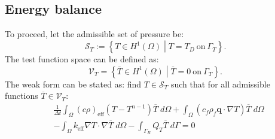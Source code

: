 \subsection{Energy balance}
To proceed, let the admissible set of pressure be:
\begin{equation*}
	\mathscr{S}_T := \left\{T \in H^1 (\Omega) \middle|
	T = T_D~\text{on}~\Gamma_T \right\}.
\end{equation*}
The test function space can be defined as:
\begin{equation*}
\mathscr{V}_{T}= \left \{{\overline{T}}\in H^1(\Omega) \middle | {\overline{T}} =0~\text{on}~\Gamma_T \right \}.
\end{equation*}
The weak form can be stated as: find $T\in\mathscr{S}_T$ such that for all admissible functions $\overline{T}\in\mathscr{V}_T$:
\begin{equation} \label{Eq:waekform_T}
    \begin{aligned}
&\frac{1}{\Delta t} \int_{\Omega} \left( c\rho\right)_{\text{eff}} \left(T-T^{n-1}\right) \overline{T} \; d\Omega+\int_{\Omega} \left( c_f \rho_f \mathbf{q}\cdot \nabla T \right) \overline{T}  \; d\Omega \\&-\int_{\Omega}{k}_{\text{eff}} \nabla T \cdot \nabla \overline{T}\; d\Omega  -\int_{\Gamma_B}Q_T {\overline{T}} \; d\Gamma 
=0
    \end{aligned}
\end{equation}